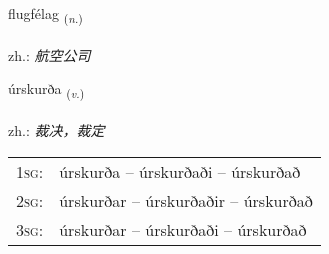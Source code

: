 \documentclass[frontgrid, backgrid]{flacards}\usepackage[]{graphicx}\usepackage[]{xcolor}
\begin{document}
\renewcommand{\flhead}{\vskip5pt \fboxsep=0pt {\small\bfseries\footnotesize Nafnorð | 名词}}
\renewcommand{\fcfoot}{\vskip5pt \fboxsep=0pt \hspace{2pt}{\small\bfseries\footnotesize 3K}}

\renewcommand{\blhead}{\vskip5pt {\small\bfseries\footnotesize Nafnorð | 名词 }}
\renewcommand{\bcfoot}{\vskip5pt \hspace{2pt}{\small\bfseries\footnotesize 3K}}


{flugfélag \small{\textsubscript{(\textit{n.})}} \\[1ex] %
\textphonetic{[flʏxfjɛlaɣ]} \\
zh.: \emph{航空公司} \\  [2ex]
\renewcommand*{\arraystretch}{0.8}
}

\renewcommand{\flhead}{\vskip5pt \fboxsep=0pt {\small\bfseries\footnotesize Sagnorð | 动词}}
\renewcommand{\fcfoot}{\vskip5pt \fboxsep=0pt \hspace{2pt}{\small\bfseries\footnotesize 3K}}

\renewcommand{\blhead}{\vskip5pt {\small\bfseries\footnotesize Sagnorð | 动词 }}
\renewcommand{\bcfoot}{\vskip5pt \hspace{2pt}{\small\bfseries\footnotesize 3K}}


{úrskurða \small{\textsubscript{(\textit{v.})}} \\[1ex] %
\textphonetic{[ur̥skʏrða]} \\
zh.: \emph{裁决，裁定} \\  [2ex]
\renewcommand*{\arraystretch}{0.8}
\begin{tabular}{p{1cm}l}
\textsc{1sg}: & úrskurða -- úrskurðaði -- úrskurðað \\ 
\textsc{2sg}: & úrskurðar -- úrskurðaðir -- úrskurðað \\ 
\textsc{3sg}: & úrskurðar -- úrskurðaði -- úrskurðað \\ 
\end{tabular}
}
\end{document}
